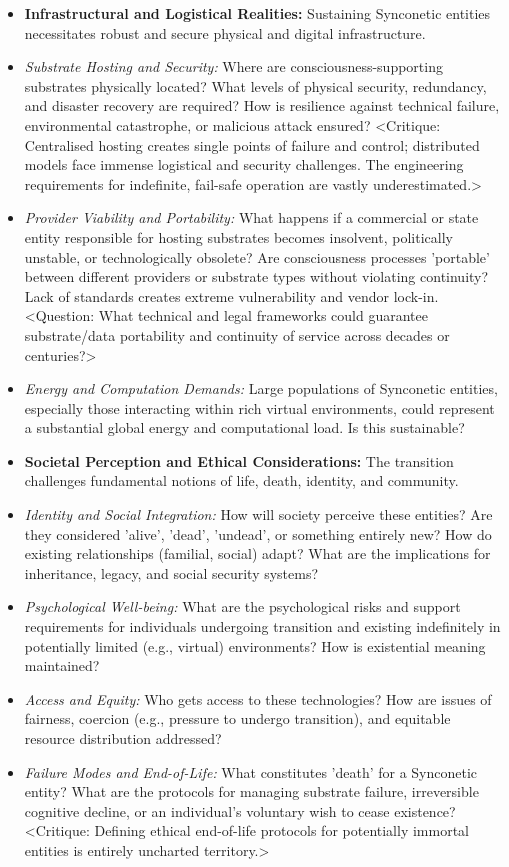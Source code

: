 \documentclass[10pt]{article}
\begin{document}
\begin{sloppypar}
\begin{itemize}
    \item \textbf{Infrastructural and Logistical Realities:} Sustaining Synconetic entities necessitates robust and secure physical and digital infrastructure.
    \item \textit{Substrate Hosting and Security:} Where are consciousness-supporting substrates physically located? What levels of physical security, redundancy, and disaster recovery are required? How is resilience against technical failure, environmental catastrophe, or malicious attack ensured? <Critique: Centralised hosting creates single points of failure and control; distributed models face immense logistical and security challenges. The engineering requirements for indefinite, fail-safe operation are vastly underestimated.>
    \item \textit{Provider Viability and Portability:} What happens if a commercial or state entity responsible for hosting substrates becomes insolvent, politically unstable, or technologically obsolete? Are consciousness processes 'portable' between different providers or substrate types without violating continuity? Lack of standards creates extreme vulnerability and vendor lock-in. <Question: What technical and legal frameworks could guarantee substrate/data portability and continuity of service across decades or centuries?>
    \item \textit{Energy and Computation Demands:} Large populations of Synconetic entities, especially those interacting within rich virtual environments, could represent a substantial global energy and computational load. Is this sustainable?

    \item \textbf{Societal Perception and Ethical Considerations:} The transition challenges fundamental notions of life, death, identity, and community.
    \item \textit{Identity and Social Integration:} How will society perceive these entities? Are they considered 'alive', 'dead', 'undead', or something entirely new? How do existing relationships (familial, social) adapt? What are the implications for inheritance, legacy, and social security systems?
    \item \textit{Psychological Well-being:} What are the psychological risks and support requirements for individuals undergoing transition and existing indefinitely in potentially limited (e.g., virtual) environments? How is existential meaning maintained?
    \item \textit{Access and Equity:} Who gets access to these technologies? How are issues of fairness, coercion (e.g., pressure to undergo transition), and equitable resource distribution addressed?
    \item \textit{Failure Modes and End-of-Life:} What constitutes 'death' for a Synconetic entity? What are the protocols for managing substrate failure, irreversible cognitive decline, or an individual's voluntary wish to cease existence? <Critique: Defining ethical end-of-life protocols for potentially immortal entities is entirely uncharted territory.>


\end{itemize}
\end{sloppypar}
\end{document}
